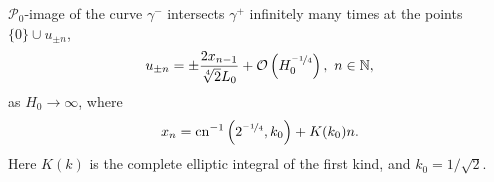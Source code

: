 \begin{proposition}
	$\mathcal{P}_0$-image of the curve $\gamma^-$ intersects $\gamma^+$ infinitely many times at the points $\{ 0 \} \cup {u_{\pm n}}$,
	\begin{equation}
		u_{\pm n} = \pm \frac{2 x_{n-1}}{\sqrt[4]{2} L_0} + \mathcal{O} \left( H_0^{\nicefrac{-1}{4}} \right), \ n \in \mathbb{N},
	\label{eq:separatrix-map-un}
	\end{equation}
	as $H_0 \to \infty$, where
	\begin{equation}
		x_n = \mathrm{cn}^{-1} \left( 2^{\nicefrac{-1}{4}}, k_0 \right) + K(k_0) n.
	\label{eq:separatrix-map-xn}
	\end{equation}
	Here $K(k)$ is the complete elliptic integral of the first kind, and $k_0 = 1 / \sqrt{2}$. 
\label{prop:separatrix-map}
\end{proposition}
